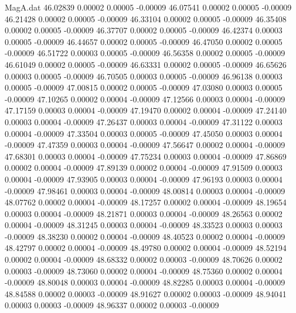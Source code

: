 \begin{filecontents}{MagA.dat}
  46.02839    0.00002    0.00005   -0.00009
  46.07541    0.00002    0.00005   -0.00009
  46.21428    0.00002    0.00005   -0.00009
  46.33104    0.00002    0.00005   -0.00009
  46.35408    0.00002    0.00005   -0.00009
  46.37707    0.00002    0.00005   -0.00009
  46.42374    0.00003    0.00005   -0.00009
  46.44657    0.00002    0.00005   -0.00009
  46.47050    0.00002    0.00005   -0.00009
  46.51722    0.00003    0.00005   -0.00009
  46.56358    0.00002    0.00005   -0.00009
  46.61049    0.00002    0.00005   -0.00009
  46.63331    0.00002    0.00005   -0.00009
  46.65626    0.00003    0.00005   -0.00009
  46.70505    0.00003    0.00005   -0.00009
  46.96138    0.00003    0.00005   -0.00009
  47.00815    0.00002    0.00005   -0.00009
  47.03080    0.00003    0.00005   -0.00009
  47.10265    0.00002    0.00004   -0.00009
  47.12566    0.00003    0.00004   -0.00009
  47.17159    0.00003    0.00004   -0.00009
  47.19470    0.00002    0.00004   -0.00009
  47.24140    0.00003    0.00004   -0.00009
  47.26437    0.00003    0.00004   -0.00009
  47.31122    0.00003    0.00004   -0.00009
  47.33504    0.00003    0.00005   -0.00009
  47.45050    0.00003    0.00004   -0.00009
  47.47359    0.00003    0.00004   -0.00009
  47.56647    0.00002    0.00004   -0.00009
  47.68301    0.00003    0.00004   -0.00009
  47.75234    0.00003    0.00004   -0.00009
  47.86869    0.00002    0.00004   -0.00009
  47.89139    0.00002    0.00004   -0.00009
  47.91509    0.00003    0.00004   -0.00009
  47.93905    0.00003    0.00004   -0.00009
  47.96193    0.00003    0.00004   -0.00009
  47.98461    0.00003    0.00004   -0.00009
  48.00814    0.00003    0.00004   -0.00009
  48.07762    0.00002    0.00004   -0.00009
  48.17257    0.00002    0.00004   -0.00009
  48.19654    0.00003    0.00004   -0.00009
  48.21871    0.00003    0.00004   -0.00009
  48.26563    0.00002    0.00004   -0.00009
  48.31245    0.00003    0.00004   -0.00009
  48.33523    0.00003    0.00003   -0.00009
  48.38230    0.00002    0.00004   -0.00009
  48.40523    0.00002    0.00004   -0.00009
  48.42797    0.00002    0.00004   -0.00009
  48.49780    0.00002    0.00004   -0.00009
  48.52194    0.00002    0.00004   -0.00009
  48.68332    0.00002    0.00003   -0.00009
  48.70626    0.00002    0.00003   -0.00009
  48.73060    0.00002    0.00004   -0.00009
  48.75360    0.00002    0.00004   -0.00009
  48.80048    0.00003    0.00004   -0.00009
  48.82285    0.00003    0.00004   -0.00009
  48.84588    0.00002    0.00003   -0.00009
  48.91627    0.00002    0.00003   -0.00009
  48.94041    0.00003    0.00003   -0.00009
  48.96337    0.00002    0.00003   -0.00009

\end{filecontents}
